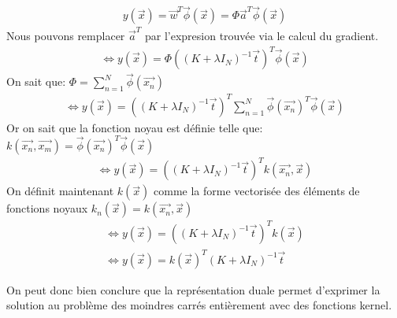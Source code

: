 \begin{equation}
\begin{split}
	y(\overrightarrow{x}) = \overrightarrow{w}^T \overrightarrow{\phi}(\overrightarrow{x}) = \Phi \overrightarrow{a}^T \overrightarrow{\phi}(\overrightarrow{x})
\end{split}
\end{equation}
Nous pouvons remplacer $\overrightarrow{a}^T$ par l'expresion trouvée via le calcul du gradient.
\begin{equation}
\begin{split}
	\iff y(\overrightarrow{x}) = \Phi \left((K + \lambda I_N)^{-1} \overrightarrow{t}\right)^T \overrightarrow{\phi}(\overrightarrow{x})
\end{split}
\end{equation}
On sait que: $\Phi = \sum_{n=1}^N \overrightarrow{\phi}(\overrightarrow{x_n})$
\begin{equation}
\begin{split}
	\iff y(\overrightarrow{x}) = \left((K + \lambda I_N)^{-1} \overrightarrow{t}\right)^T \sum_{n=1}^N \overrightarrow{\phi}(\overrightarrow{x_n})^T\overrightarrow{\phi}(\overrightarrow{x})
\end{split}
\end{equation}
Or on sait que la fonction noyau est définie telle que: $k(\overrightarrow{x_n}, \overrightarrow{x_m}) = \overrightarrow{\phi}(\overrightarrow{x_n})^T \overrightarrow{\phi}(\overrightarrow{x})$
\begin{equation}
\begin{split}
	\iff y(\overrightarrow{x}) = \left((K + \lambda I_N)^{-1} \overrightarrow{t}\right)^T k(\overrightarrow{x_n}, \overrightarrow{x})
\end{split}
\end{equation}
On définit maintenant $k(\overrightarrow{x})$ comme la forme vectorisée des éléments de fonctions noyaux $ k_n(\overrightarrow{x}) = k(\overrightarrow{x_n}, \overrightarrow{x}) $
\begin{equation}
\begin{split}
	\iff y(\overrightarrow{x}) = \left((K + \lambda I_N)^{-1} \overrightarrow{t}\right)^T k(\overrightarrow{x}) \\
	\iff y(\overrightarrow{x}) = k(\overrightarrow{x})^T (K+\lambda I_N)^{-1} \overrightarrow{t}
\end{split}
\end{equation}	

On peut donc bien conclure que la représentation duale permet d'exprimer la solution au problème des moindres carrés entièrement avec des fonctions kernel.

